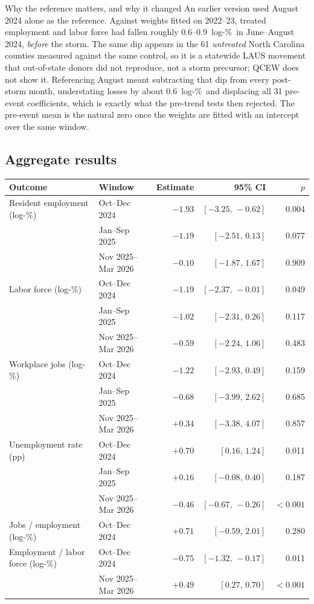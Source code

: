 \documentclass[11pt,a4paper]{article}
\newcommand{\lp}{log-\%}
\begin{document}
\begin{keybox}{Why the reference matters, and why it changed}
An earlier version used August 2024 alone as the reference. Against weights fitted on 2022--23, treated
employment and labor force had fallen roughly 0.6--0.9~\lp\ in June--August 2024, \emph{before} the
storm. The same dip appears in the 61 \emph{untreated} North Carolina counties measured against the same
control, so it is a statewide LAUS movement that out-of-state donors did not reproduce, not a storm
precursor; QCEW does not show it. Referencing August meant subtracting that dip from every post-storm
month, understating losses by about 0.6~\lp\ and displacing all 31 pre-event coefficients, which is
exactly what the pre-trend tests then rejected. The pre-event mean is the natural zero once the weights
are fitted with an intercept over the same window.
\end{keybox}

\subsection{Aggregate results}
\begin{center}\small
\begin{tabular}{llrrr}
\toprule
Outcome & Window & Estimate & 95\% CI & $p$\\
\midrule
Resident employment (\lp) & Oct--Dec 2024 & $-1.93$ & $[-3.25,\,-0.62]$ & 0.004\\
 & Jan--Sep 2025 & $-1.19$ & $[-2.51,\,0.13]$ & 0.077\\
 & Nov 2025--Mar 2026 & $-0.10$ & $[-1.87,\,1.67]$ & 0.909\\
Labor force (\lp) & Oct--Dec 2024 & $-1.19$ & $[-2.37,\,-0.01]$ & 0.049\\
 & Jan--Sep 2025 & $-1.02$ & $[-2.31,\,0.26]$ & 0.117\\
 & Nov 2025--Mar 2026 & $-0.59$ & $[-2.24,\,1.06]$ & 0.483\\
Workplace jobs (\lp) & Oct--Dec 2024 & $-1.22$ & $[-2.93,\,0.49]$ & 0.159\\
 & Jan--Sep 2025 & $-0.68$ & $[-3.99,\,2.62]$ & 0.685\\
 & Nov 2025--Mar 2026 & $+0.34$ & $[-3.38,\,4.07]$ & 0.857\\
Unemployment rate (pp) & Oct--Dec 2024 & $+0.70$ & $[0.16,\,1.24]$ & 0.011\\
 & Jan--Sep 2025 & $+0.16$ & $[-0.08,\,0.40]$ & 0.187\\
 & Nov 2025--Mar 2026 & $-0.46$ & $[-0.67,\,-0.26]$ & $<0.001$\\
Jobs / employment (\lp) & Oct--Dec 2024 & $+0.71$ & $[-0.59,\,2.01]$ & 0.280\\
Employment / labor force (\lp) & Oct--Dec 2024 & $-0.75$ & $[-1.32,\,-0.17]$ & 0.011\\
 & Nov 2025--Mar 2026 & $+0.49$ & $[0.27,\,0.70]$ & $<0.001$\\
\bottomrule
\end{tabular}
\end{center}
\end{document}
